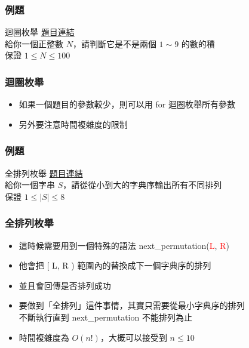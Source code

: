 \documentclass{beamer}
\begin{document}
\begin{frame}
    \frametitle{例題}
    \begin{block}{迴圈枚舉}
        \href{https://atcoder.jp/contests/abc144/tasks/abc144_b}{題目連結}\\
        給你一個正整數 $N$，請判斷它是不是兩個 $1 \sim 9$ 的數的積\\
        保證 $1 \leq N \leq 100$
    \end{block}
\end{frame}

\begin{frame}
    \frametitle{迴圈枚舉}
    \begin{itemize}
        \item 如果一個題目的參數較少，則可以用 for 迴圈枚舉所有參數
        \item 另外要注意時間複雜度的限制
    \end{itemize}
\end{frame}

\begin{frame}
    \frametitle{例題}
    \begin{block}{全排列枚舉}
        \href{https://cses.fi/problemset/task/1622}{題目連結}\\
        給你一個字串 $S$，請從從小到大的字典序輸出所有不同排列\\
        保證 $1 \leq |S| \leq 8$
    \end{block}
\end{frame}

\begin{frame}
    \frametitle{全排列枚舉}
    \begin{itemize}
        \item 這時候需要用到一個特殊的語法  next\_permutation(\textcolor{red}{L}, \textcolor{red}{R})
        \item 他會把 [ L, R ) 範圍內的替換成下一個字典序的排列
        \item 並且會回傳是否排列成功
        \vspace{0.5cm}
        \item<2-> 要做到「全排列」這件事情，其實只需要從最小字典序的排列\\
        不斷執行直到 next\_permutation 不能排列為止
        \item<2-> 時間複雜度為 $O(n!)$，大概可以接受到 $n \leq 10$
    \end{itemize}
\end{frame}
\end{document}
